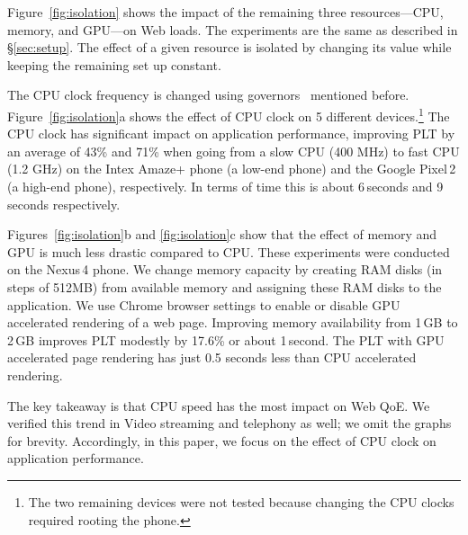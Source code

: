 Figure~\ref{fig:isolation} shows the impact of the remaining three resources---CPU, memory, and GPU---on Web loads. The experiments are the same as described in \S\ref{sec:setup}. The effect of a given resource is isolated by changing its value while keeping the remaining set up constant. 

The CPU clock frequency is changed using governors~\cite{ad-governors} mentioned before. Figure~\ref{fig:isolation}a shows the effect of CPU clock on 5 different devices.\footnote{The two remaining devices were not tested because changing the CPU clocks required rooting the phone.} 
The CPU clock has significant impact on application performance, improving PLT by an average of 43\% and 71\% 
when going from a slow CPU (400 MHz) to fast CPU (1.2 GHz) on the Intex Amaze+ phone (a low-end phone) and the Google Pixel\,2 (a high-end phone), respectively. In terms of time this is about 6\,seconds 
and 9\,seconds respectively.

Figures~\ref{fig:isolation}b and \ref{fig:isolation}c show that the effect of memory and GPU is much less drastic compared to CPU. These experiments were conducted on the Nexus\,4 phone.
We change memory capacity by creating RAM disks \cite{ramdisks} (in steps of 512MB) from available memory and assigning these RAM disks to the application.  %
We use Chrome browser settings to enable or disable  GPU accelerated rendering of a web page. Improving memory availability from 1\,GB to 2\,GB improves PLT  modestly by 17.6\% or about 1\,second. 
The PLT with GPU accelerated page rendering has just 0.5 seconds less than CPU accelerated rendering.  

The key takeaway is that CPU speed has the most impact on Web QoE. We verified this trend in Video streaming and telephony as well; we omit the graphs for brevity. 
Accordingly, in this paper, we focus on the effect of CPU clock on application performance. 


 
